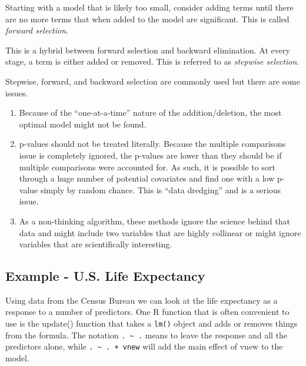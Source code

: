 \documentclass[]{book}
\newenvironment{Shaded}{\begin{snugshade}}{\end{snugshade}}
\newcommand{\KeywordTok}[1]{\textcolor[rgb]{0.13,0.29,0.53}{\textbf{{#1}}}}
\newcommand{\DataTypeTok}[1]{\textcolor[rgb]{0.13,0.29,0.53}{{#1}}}
\newcommand{\StringTok}[1]{\textcolor[rgb]{0.31,0.60,0.02}{{#1}}}
\newcommand{\CommentTok}[1]{\textcolor[rgb]{0.56,0.35,0.01}{\textit{{#1}}}}
\newcommand{\NormalTok}[1]{{#1}}
\theoremstyle{definition}
\theoremstyle{definition}
\theoremstyle{remark}
\begin{document}
Starting with a model that is likely too small, consider adding terms
until there are no more terms that when added to the model are
significant. This is called \emph{forward selection}.

This is a hybrid between forward selection and backward elimination. At
every stage, a term is either added or removed. This is referred to as
\emph{stepwise selection}.

Stepwise, forward, and backward selection are commonly used but there
are some issues.

\begin{enumerate}
\def\labelenumi{\arabic{enumi}.}
\item
  Because of the ``one-at-a-time'' nature of the addition/deletion, the
  most optimal model might not be found.
\item
  p-values should not be treated literally. Because the multiple
  comparisons issue is completely ignored, the p-values are lower than
  they should be if multiple comparisons were accounted for. As such, it
  is possible to sort through a huge number of potential covariates and
  find one with a low p-value simply by random chance. This is ``data
  dredging'' and is a serious issue.
\item
  As a non-thinking algorithm, these methods ignore the science behind
  that data and might include two variables that are highly collinear or
  might ignore variables that are scientifically interesting.
\end{enumerate}

\subsection{Example - U.S. Life
Expectancy}\label{example---u.s.-life-expectancy}

Using data from the Census Bureau we can look at the life expectancy as
a response to a number of predictors. One R function that is often
convenient to use is the update() function that takes a \texttt{lm()}
object and adds or removes things from the formula. The notation
\texttt{.\ \textasciitilde{}\ .} means to leave the response and all the
predictors alone, while \texttt{.\ \textasciitilde{}\ .\ +\ vnew} will
add the main effect of vnew to the model.

\begin{Shaded}
\end{Shaded}
\end{document}
